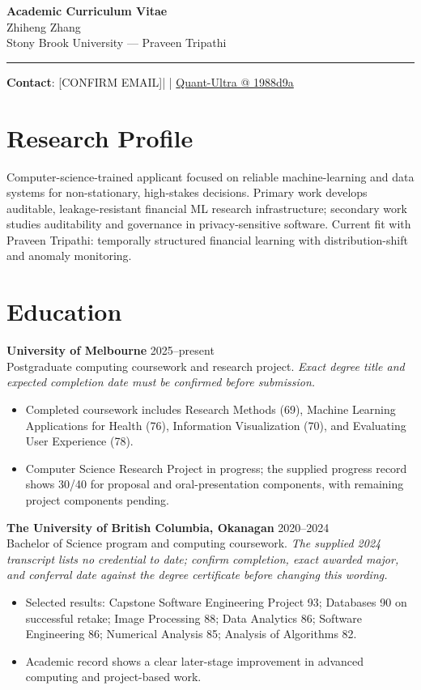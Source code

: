 \documentclass[11pt]{article}
\makeatletter
\newcommand{\ApplicantName}{Zhiheng Zhang}
\newcommand{\ApplicantEmail}{[CONFIRM EMAIL]}
\newcommand{\ApplicantPhone}{[CONFIRM PHONE]}
\newcommand{\ApplicantGitHub}{\href{https://github.com/zhiheng-zhang-Mera/Quant-Ultra/tree/1988d9a8530da91a8158de864d098ea869098923}{Quant-Ultra @ 1988d9a}}
\makeatother
\begin{document}
\begin{center}
{\LARGE\bfseries Academic Curriculum Vitae}\\[0.25em]
{\large \ApplicantName}\\
Stony Brook University --- Praveen Tripathi
\end{center}
\vspace{0.35em}\hrule\vspace{0.65em}

\textbf{Contact}: \ApplicantEmail\quad | \quad \ApplicantPhone\quad | \quad \ApplicantGitHub

\section*{Research Profile}
Computer-science-trained applicant focused on reliable machine-learning and data systems for non-stationary, high-stakes decisions. Primary work develops auditable, leakage-resistant financial ML research infrastructure; secondary work studies auditability and governance in privacy-sensitive software. Current fit with Praveen Tripathi: temporally structured financial learning with distribution-shift and anomaly monitoring.

\section*{Education}
\textbf{University of Melbourne} \hfill 2025--present\\
Postgraduate computing coursework and research project. \textit{Exact degree title and expected completion date must be confirmed before submission.}
\begin{itemize}
\item Completed coursework includes Research Methods (69), Machine Learning Applications for Health (76), Information Visualization (70), and Evaluating User Experience (78).
\item Computer Science Research Project in progress; the supplied progress record shows 30/40 for proposal and oral-presentation components, with remaining project components pending.
\end{itemize}

\textbf{The University of British Columbia, Okanagan} \hfill 2020--2024\\
Bachelor of Science program and computing coursework. \textit{The supplied 2024 transcript lists no credential to date; confirm completion, exact awarded major, and conferral date against the degree certificate before changing this wording.}
\begin{itemize}
\item Selected results: Capstone Software Engineering Project 93; Databases 90 on successful retake; Image Processing 88; Data Analytics 86; Software Engineering 86; Numerical Analysis 85; Analysis of Algorithms 82.
\item Academic record shows a clear later-stage improvement in advanced computing and project-based work.
\end{itemize}
\end{document}
